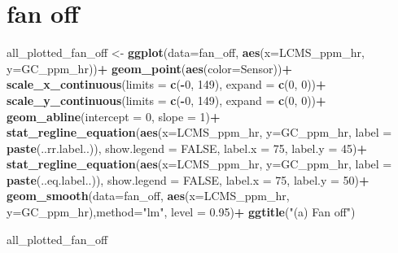 \documentclass[
]{article}
\newenvironment{Shaded}{\begin{snugshade}}{\end{snugshade}}
\newcommand{\AttributeTok}[1]{\textcolor[rgb]{0.13,0.29,0.53}{#1}}
\newcommand{\ConstantTok}[1]{\textcolor[rgb]{0.56,0.35,0.01}{#1}}
\newcommand{\DecValTok}[1]{\textcolor[rgb]{0.00,0.00,0.81}{#1}}
\newcommand{\FloatTok}[1]{\textcolor[rgb]{0.00,0.00,0.81}{#1}}
\newcommand{\FunctionTok}[1]{\textcolor[rgb]{0.13,0.29,0.53}{\textbf{#1}}}
\newcommand{\NormalTok}[1]{#1}
\newcommand{\OtherTok}[1]{\textcolor[rgb]{0.56,0.35,0.01}{#1}}
\newcommand{\SpecialCharTok}[1]{\textcolor[rgb]{0.81,0.36,0.00}{\textbf{#1}}}
\newcommand{\StringTok}[1]{\textcolor[rgb]{0.31,0.60,0.02}{#1}}
\begin{document}
\section{fan off}\label{fan-off}

\begin{Shaded}
\begin{Highlighting}[]
\NormalTok{all\_plotted\_fan\_off }\OtherTok{\textless{}{-}}
\FunctionTok{ggplot}\NormalTok{(}\AttributeTok{data=}\NormalTok{fan\_off, }\FunctionTok{aes}\NormalTok{(}\AttributeTok{x=}\NormalTok{LCMS\_ppm\_hr, }\AttributeTok{y=}\NormalTok{GC\_ppm\_hr))}\SpecialCharTok{+}
  \FunctionTok{geom\_point}\NormalTok{(}\FunctionTok{aes}\NormalTok{(}\AttributeTok{color=}\NormalTok{Sensor))}\SpecialCharTok{+}
  \FunctionTok{scale\_x\_continuous}\NormalTok{(}\AttributeTok{limits =} \FunctionTok{c}\NormalTok{(}\SpecialCharTok{{-}}\DecValTok{0}\NormalTok{, }\DecValTok{149}\NormalTok{), }\AttributeTok{expand =} \FunctionTok{c}\NormalTok{(}\DecValTok{0}\NormalTok{, }\DecValTok{0}\NormalTok{))}\SpecialCharTok{+}
  \FunctionTok{scale\_y\_continuous}\NormalTok{(}\AttributeTok{limits =} \FunctionTok{c}\NormalTok{(}\SpecialCharTok{{-}}\DecValTok{0}\NormalTok{, }\DecValTok{149}\NormalTok{), }\AttributeTok{expand =} \FunctionTok{c}\NormalTok{(}\DecValTok{0}\NormalTok{, }\DecValTok{0}\NormalTok{))}\SpecialCharTok{+}
  \FunctionTok{geom\_abline}\NormalTok{(}\AttributeTok{intercept =} \DecValTok{0}\NormalTok{, }\AttributeTok{slope =} \DecValTok{1}\NormalTok{)}\SpecialCharTok{+}
  \FunctionTok{stat\_regline\_equation}\NormalTok{(}\FunctionTok{aes}\NormalTok{(}\AttributeTok{x=}\NormalTok{LCMS\_ppm\_hr, }\AttributeTok{y=}\NormalTok{GC\_ppm\_hr, }
    \AttributeTok{label =}  \FunctionTok{paste}\NormalTok{(..rr.label..)),}
    \AttributeTok{show.legend =} \ConstantTok{FALSE}\NormalTok{, }
    \AttributeTok{label.x =} \DecValTok{75}\NormalTok{,}
    \AttributeTok{label.y =} \DecValTok{45}\NormalTok{)}\SpecialCharTok{+}
  \FunctionTok{stat\_regline\_equation}\NormalTok{(}\FunctionTok{aes}\NormalTok{(}\AttributeTok{x=}\NormalTok{LCMS\_ppm\_hr, }\AttributeTok{y=}\NormalTok{GC\_ppm\_hr, }
    \AttributeTok{label =} \FunctionTok{paste}\NormalTok{(..eq.label..)),}
    \AttributeTok{show.legend =} \ConstantTok{FALSE}\NormalTok{, }
    \AttributeTok{label.x =} \DecValTok{75}\NormalTok{, }
    \AttributeTok{label.y =} \DecValTok{50}\NormalTok{)}\SpecialCharTok{+}
  \FunctionTok{geom\_smooth}\NormalTok{(}\AttributeTok{data=}\NormalTok{fan\_off, }\FunctionTok{aes}\NormalTok{(}\AttributeTok{x=}\NormalTok{LCMS\_ppm\_hr, }\AttributeTok{y=}\NormalTok{GC\_ppm\_hr),}\AttributeTok{method=}\StringTok{"lm"}\NormalTok{, }\AttributeTok{level =} \FloatTok{0.95}\NormalTok{)}\SpecialCharTok{+}
  \FunctionTok{ggtitle}\NormalTok{(}\StringTok{"(a) Fan off"}\NormalTok{)}
  

\NormalTok{all\_plotted\_fan\_off}
\end{Highlighting}
\end{Shaded}
\end{document}
